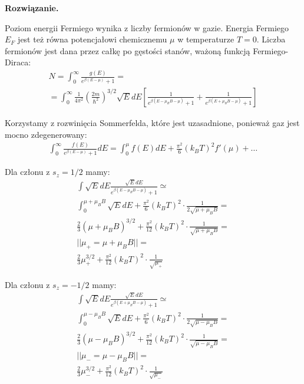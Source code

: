 \documentclass[11pt,a4paper]{article}
\newenvironment{solution}{\vspace{1cm} \par\textbf{Rozwiązanie.} \vspace{1cm}}{}
\begin{document}
\begin{solution}

Poziom energii Fermiego wynika z liczby fermionów w gazie. 
Energia Fermiego $E_F$ jest też równa potencjałowi chemicznemu $\mu$ 
w temperaturze $T=0$. Liczba fermionów jest dana przez całkę po gęstości stanów, ważoną funkcją Fermiego-Diraca:
\begin{align*}
N = \int_{0}^{\infty} \frac{g(E)}{e^{\beta (E - \mu)} + 1} = \\
= \int_{0}^{\infty} \frac{1}{4\pi^{2}} \left( \frac{2m}{\hbar^2} \right)^{3/2} \sqrt{E} dE 
\left[
\frac{1}{e^{\beta (E - \mu_B B - \mu)} + 1} +
\frac{1}{e^{\beta (E + \mu_B B - \mu)} + 1}
\right]
\end{align*}

Korzystamy z rozwinięcia Sommerfelda, które jest uzasadnione, ponieważ gaz 
jest mocno zdegenerowany:
\begin{align*}
\int_{0}^{\infty} \frac{f(E)}{e^{\beta (E - \mu)} + 1} dE = \int_{0}^{\mu} f(E) dE + \frac{\pi^2}{6} (k_B T)^2 f'(\mu) + \ldots
\end{align*}

Dla członu z $s_z = 1/2$ mamy:
\begin{align*}
\int \sqrt{E} dE \frac{\sqrt{E} dE}{e^{\beta (E - \mu_B B - \mu)} + 1}  \simeq \\
\int_0^{\mu + \mu_B B} \sqrt{E} dE + \frac{\pi^2}{6} (k_B T)^2 \cdot \frac{1}{2\sqrt{\mu + \mu_B B}} = \\
\frac{2}{3} (\mu + \mu_B B)^{3/2} + \frac{\pi^2}{12} (k_B T)^2 \cdot \frac{1}{\sqrt{\mu + \mu_B B}} = \\
|| \mu_{+} = \mu + \mu_B B || = \\
\frac{2}{3} \mu_{+}^{3/2} + \frac{\pi^2}{12} (k_B T)^2 \cdot \frac{1}{\sqrt{\mu_{+}}}
\end{align*}

Dla członu z $s_z = -1/2$ mamy:
\begin{align*}
\int \sqrt{E} dE \frac{\sqrt{E} dE}{e^{\beta (E + \mu_B B - \mu)} + 1}  \simeq \\  
\int_0^{\mu - \mu_B B} \sqrt{E} dE + \frac{\pi^2}{6} (k_B T)^2 \cdot \frac{1}{2\sqrt{\mu - \mu_B B}} = \\
\frac{2}{3} (\mu - \mu_B B)^{3/2} + \frac{\pi^2}{12} (k_B T)^2 \cdot \frac{1}{\sqrt{\mu - \mu_B B}} = \\
|| \mu_{-} = \mu - \mu_B B || = \\
\frac{2}{3} \mu_{-}^{3/2} + \frac{\pi^2}{12} (k_B T)^2 \cdot \frac{1}{\sqrt{\mu_{-}}}
\end{align*}


\end{solution}
\end{document}
